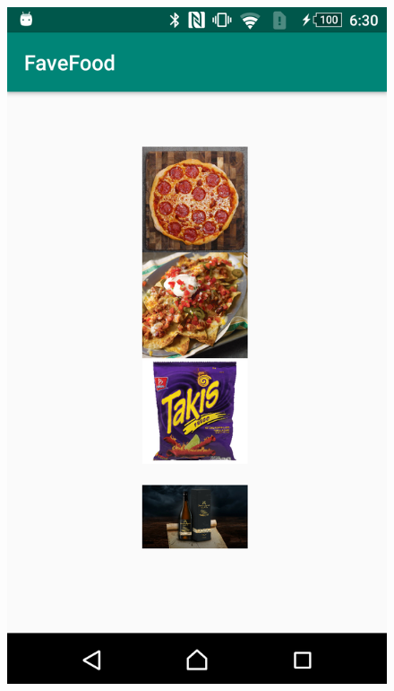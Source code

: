 \documentclass{scrartcl}
\begin{document}
\begin{figure}[h]
    \includegraphics[scale=0.2]{images/screen5.png}

\end{figure}
\end{document}
